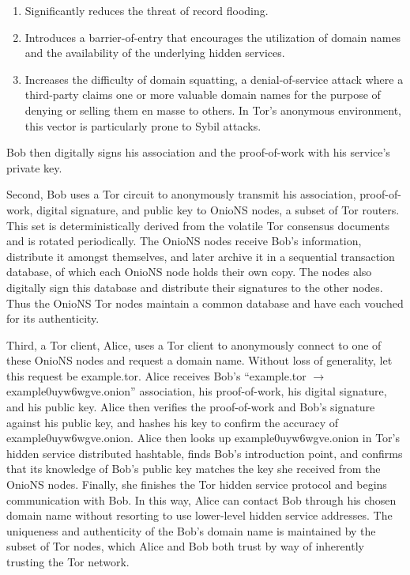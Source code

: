 \begin{enumerate}
	\item Significantly reduces the threat of record flooding.
	\item Introduces a barrier-of-entry that encourages the utilization of domain names and the availability of the underlying hidden services.
	\item Increases the difficulty of domain squatting, a denial-of-service attack where a third-party claims one or more valuable domain names for the purpose of denying or selling them en masse to others. In Tor's anonymous environment, this vector is particularly prone to Sybil attacks.
\end{enumerate}

Bob then digitally signs his association and the proof-of-work with his service's private key.

Second, Bob uses a Tor circuit to anonymously transmit his association, proof-of-work, digital signature, and public key to OnioNS nodes, a subset of Tor routers. This set is deterministically derived from the volatile Tor consensus documents and is rotated periodically. The OnioNS nodes receive Bob's information, distribute it amongst themselves, and later archive it in a sequential transaction database, of which each OnioNS node holds their own copy. The nodes also digitally sign this database and distribute their signatures to the other nodes. Thus the OnioNS Tor nodes maintain a common database and have each vouched for its authenticity.

Third, a Tor client, Alice, uses a Tor client to anonymously connect to one of these OnioNS nodes and request a domain name. Without loss of generality, let this request be example.tor. Alice receives Bob's ``example.tor $ \rightarrow $ example0uyw6wgve.onion'' association, his proof-of-work, his digital signature, and his public key. Alice then verifies the proof-of-work and Bob's signature against his public key, and hashes his key to confirm the accuracy of example0uyw6wgve.onion. Alice then looks up example0uyw6wgve.onion in Tor's hidden service distributed hashtable, finds Bob's introduction point, and confirms that its knowledge of Bob's public key matches the key she received from the OnioNS nodes. Finally, she finishes the Tor hidden service protocol and begins communication with Bob. In this way, Alice can contact Bob through his chosen domain name without resorting to use lower-level hidden service addresses. The uniqueness and authenticity of the Bob's domain name is maintained by the subset of Tor nodes, which Alice and Bob both trust by way of inherently trusting the Tor network.

